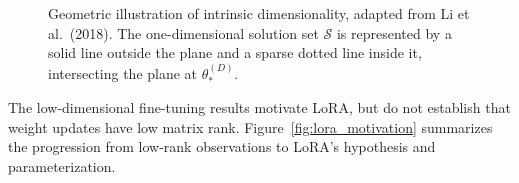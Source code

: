 \begin{figure}[htbp]

	\caption{
		Geometric illustration of intrinsic dimensionality,
		adapted from Li et al.~(2018).
		The one-dimensional solution set $\mathcal S$ is
		represented by a solid line outside the plane and
		a sparse dotted line inside it, intersecting the
		plane at $\theta_*^{(D)}$.
	}
	\label{fig:intrinsic_dimension}

\end{figure}

The low-dimensional fine-tuning results motivate LoRA, but do not establish that weight updates have low matrix rank. Figure~\ref{fig:lora_motivation} summarizes the progression from low-rank observations to LoRA's hypothesis and parameterization.



